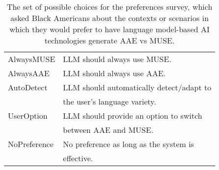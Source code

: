 \begin{table}[t]
\centering
\footnotesize
\renewcommand{\arraystretch}{0.85} %
\setlength{\tabcolsep}{4pt}
\begin{tabular}{ @{~}l @{~~~} p{55mm} @{~} }
  \toprule			
AlwaysMUSE &	LLM should always use MUSE.	\\
AlwaysAAE &	LLM should always use AAE. \\[0.5em]
AutoDetect &	LLM should automatically detect/adapt to\\&\quad the user's language variety. \\
UserOption &	LLM should provide an option to switch\\&\quad between AAE and MUSE. \\[0.5em]
NoPreference	&	No preference as long as the system is\\&\quad effective. \\
  \bottomrule			
\end{tabular}	
\caption{The set of possible choices for the preferences survey, which asked Black Americans about the contexts or scenarios in which they would prefer to have language model-based AI technologies generate AAE vs MUSE.} %
\label{table:Vignette Choices}
\end{table}






